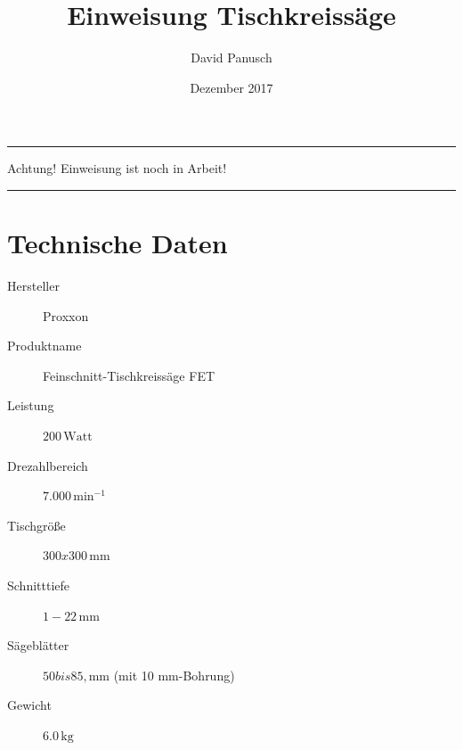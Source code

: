 \documentclass{\basedir/fablab-document}
\date{Dezember 2017}
\author{David Panusch}
\title{Einweisung Tischkreissäge}
\begin{document}
\dosecttoc
\faketableofcontents
{}
\maketitle

\color{red}
\hrule
\begin{center}
\large{Achtung! Einweisung ist noch in Arbeit!}
\vspace{0.1cm}
\end{center}
\hrule
\color{black}

\section{Technische Daten}
\begin{description}
	
    \item[Hersteller] Proxxon
    \item[Produktname] Feinschnitt-Tischkreissäge FET
    \item[Leistung] $200\,\mathrm{Watt}$
    \item[Drezahlbereich] $7.000\,\mathrm{min}^{-1}$
    \item[Tischgröße] $300 x 300\,\mathrm{mm}$
    \item[Schnitttiefe] $1 - 22\,\mathrm{mm}$ 
    \item[Sägeblätter] $50 bis 85 ,\mathrm{mm}$ (mit 10 mm-Bohrung)
    \item[Gewicht] $6.0\,\mathrm{kg}$
    
\end{description}
\end{document}
